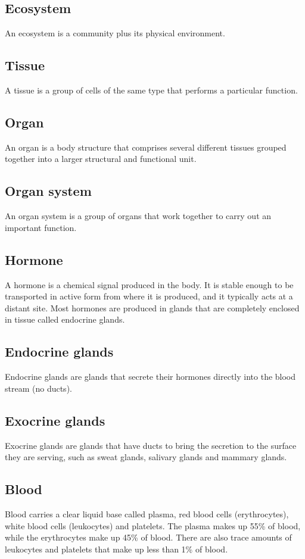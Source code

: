 \documentclass[11pt]{article}
\begin{document}
\subsection{Ecosystem}
\label{sec:orgd61e69c}
An ecosystem is a community plus its physical environment.
\subsection{Tissue}
\label{sec:org6c74132}
A tissue is a group of cells of the same type that performs a particular function.
\subsection{Organ}
\label{sec:orgd61c6fc}
An organ is a body structure that comprises several different tissues grouped together into a larger structural and functional unit.
\subsection{Organ system}
\label{sec:org01f537d}
An organ system is a group of organs that work together to carry out an important function.
\subsection{Hormone}
\label{sec:orgeab4ce9}
A hormone is a chemical signal produced in the body. It is stable enough to be transported in active form from where it is produced, and it typically acts at a distant site. Most hormones are produced in glands that are completely enclosed in tissue called endocrine glands.
\subsection{Endocrine glands}
\label{sec:orgcc02fa3}
Endocrine glands are glands that secrete their hormones directly into the blood stream (no ducts).
\subsection{Exocrine glands}
\label{sec:orgde33810}
Exocrine glands are glands that have ducts to bring the secretion to the surface they are serving, such as sweat glands, salivary glands and mammary glands.
\subsection{Blood}
\label{sec:org35f307b}
Blood carries a clear liquid base called plasma, red blood cells (erythrocytes), white blood cells (leukocytes) and platelets. The plasma makes up 55\% of blood, while the erythrocytes make up 45\% of blood. There are also trace amounts of leukocytes and platelets that make up less than 1\% of blood.
\end{document}
